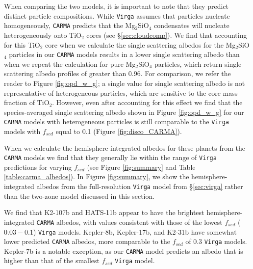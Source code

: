 \documentclass[twocolumn]{aastex63}
\begin{document}
When comparing the two models, it is important to note that they predict distinct particle compositions.  While \texttt{Virga} assumes that particles nucleate homogeneously, \texttt{CARMA} predicts that the Mg$_2$SiO$_4$ condensates will nucleate heterogeneously onto TiO$_2$ cores (see \S\ref{sec:cloudcomp}). We find that accounting for this TiO$_2$ core when we calculate the single scattering albedos for the Mg$_2$SiO$_4$ particles in our \texttt{CARMA} models results in a lower single scattering albedo than when we repeat the calculation for pure Mg$_2$SiO$_4$ particles, which return single scattering albedo profiles of greater than 0.96. For comparison, we refer the reader to Figure \ref{fig:opd_w_g}; a single value for single scattering albedo is not representative of heterogeneous particles, which are sensitive to the core mass fraction of TiO$_2$. However, even after accounting for this effect we find that the species-averaged single scattering albedo shown in Figure \ref{fig:opd_w_g} for our \texttt{CARMA} models with heterogeneous particles is still comparable to the \texttt{Virga} models with $f_{sed}$ equal to 0.1 (Figure \ref{fig:disco_CARMA}). 


When we calculate the hemisphere-integrated albedos for these planets from the \texttt{CARMA} models we find that they generally lie within the range of \texttt{Virga} predictions for varying $f_{sed}$ (see Figure \ref{fig:summary} and Table \ref{table:carma_albedos}).  \textcolor{black}{In Figure \ref{fig:summary},} we show the hemisphere-integrated albedos from the full-resolution \texttt{Virga} model from \S\ref{sec:virga} rather than the two-zone model discussed in this section. 

We find that K2-107b and HATS-11b appear to have the brightest hemisphere-integrated \texttt{CARMA} albedos, with values consistent with those of the lowest $f_{sed}$ ($0.03-0.1$) \texttt{Virga} models.  Kepler-8b, Kepler-17b, and K2-31b have somewhat lower predicted \texttt{CARMA} albedos, more comparable to the $f_{sed}$ of $0.3$ \texttt{Virga} models. Kepler-7b is a notable exception, as our \texttt{CARMA} model predicts an albedo that is higher than that of the smallest $f_{sed}$ \texttt{Virga} model.
\end{document}
